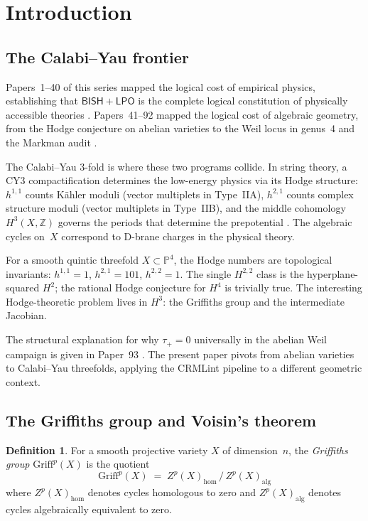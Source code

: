 \documentclass[11pt]{article}
\theoremstyle{plain}
\theoremstyle{definition}
\newtheorem{definition}[theorem]{Definition}
\theoremstyle{remark}
\newcommand{\Z}{\mathbb{Z}}
\newcommand{\PP}{\mathbb{P}}
\newcommand{\Griff}{\mathrm{Griff}}
\newcommand{\BISH}{\ensuremath{\mathsf{BISH}}}
\newcommand{\LPO}{\ensuremath{\mathsf{LPO}}}
\begin{document}
\section{Introduction}
\label{sec:intro}

\subsection{The Calabi--Yau frontier}

Papers~1--40 of this series mapped the logical cost of empirical physics, establishing that $\BISH + \LPO$ is the complete logical constitution of physically accessible theories \cite{paper40}. Papers~41--92 mapped the logical cost of algebraic geometry, from the Hodge conjecture on abelian varieties \cite{paper45,paper50,paper87} to the Weil locus in genus~4 \cite{paper84,paper85,paper86,paper88,paper89} and the Markman audit \cite{paper91}.

The Calabi--Yau 3-fold is where these two programs collide. In string theory, a CY3 compactification determines the low-energy physics via its Hodge structure: $h^{1,1}$ counts K\"ahler moduli (vector multiplets in Type~IIA), $h^{2,1}$ counts complex structure moduli (vector multiplets in Type~IIB), and the middle cohomology $H^3(X,\Z)$ governs the periods that determine the prepotential \cite{candelas-ossa-green-parkes}. The algebraic cycles on~$X$ correspond to D-brane charges in the physical theory.

For a smooth quintic threefold $X \subset \PP^4$, the Hodge numbers are topological invariants: $h^{1,1} = 1$, $h^{2,1} = 101$, $h^{2,2} = 1$. The single $H^{2,2}$ class is the hyperplane-squared $H^2$; the rational Hodge conjecture for $H^4$ is trivially true. The interesting Hodge-theoretic problem lives in $H^3$: the Griffiths group and the intermediate Jacobian.

The structural explanation for why $\tau_+ = 0$ universally in the abelian Weil campaign is given in Paper~93 \cite{paper93-svt}. The present paper pivots from abelian varieties to Calabi--Yau threefolds, applying the CRMLint pipeline to a different geometric context.

\subsection{The Griffiths group and Voisin's theorem}

\begin{definition}
For a smooth projective variety $X$ of dimension~$n$, the \emph{Griffiths group} $\Griff^p(X)$ is the quotient
\[
\Griff^p(X) \;=\; Z^p(X)_{\mathrm{hom}} \,/\, Z^p(X)_{\mathrm{alg}}
\]
where $Z^p(X)_{\mathrm{hom}}$ denotes cycles homologous to zero and $Z^p(X)_{\mathrm{alg}}$ denotes cycles algebraically equivalent to zero.
\end{definition}
\end{document}
